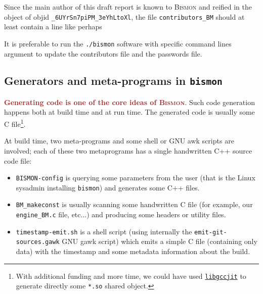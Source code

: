 \begin{appendices}
\begin{itemize}
\end{itemize}

Since the main author of this draft report is known to \textsc{Bismon}
and reified in the object of objid \texttt{\_6UYrSn7piPM\_3eYhLtoXl},
the file \texttt{contributors\_BM} should at least contain a line like
perhaps {}

It is preferable to run the \texttt{./bismon} software with specific
command lines argument to update the contributors file and the
passwords file.

\subsection{Generators and meta-programs in \texttt{bismon}}

\textcolor{brown}{\textbf{Generating code is one of the core ideas of \textsc{Bismon}}}. Such code
generation happens both at build time and at run time. The generated
code is usually some C file\footnote{With additional funding and more
time, we could have used
\href{https://gcc.gnu.org/onlinedocs/jit/}{\texttt{libgccjit}} to
generate directly some \texttt{*.so} shared object.}.

At build time, two meta-programs and some shell or GNU awk scripts are involved; each of these two metaprograms has a
single handwritten C++ source code file:

\begin{itemize}
  \item \texttt{BISMON-config}
     is
    querying some parameters from the user (that is the Linux sysadmin
    installing \texttt{bismon}) and generates some C++ files.

  \item \texttt{BM\_makeconst}
     is usually
    scanning some handwritten C file (for example, our
    \texttt{engine\_BM.c} file, etc...)  and producing some headers or
    utility files.

  \item \texttt{timestamp-emit.sh} is a shell script
    (using internally the \texttt{emit-git-sources.gawk} GNU gawk
    script)
     which emits a simple C file
    (containing only data) with the timestamp and some metadata
    information about the build.
    

\end{itemize}
\end{appendices}
